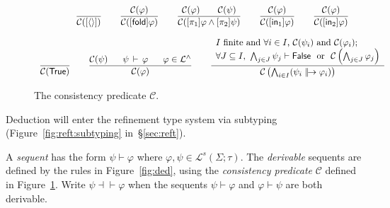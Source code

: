 \documentclass[%
  a4paper,
  UKenglish,
  cleveref,
  autoref,
  thm-restate,
  numberwithinsect,
]{lipics-v2021}
\newcommand\sle\subseteq
\newcommand\thesis{\vdash}
\newcommand\defthesisiff{\dashv\vdash}
\newcommand\thesisiff{\mathrel{\defthesisiff}}
\newcommand\pair[1]{{\langle #1\rangle}}
\newcommand\C{\mathcal{C}}		%
\newcommand\temp[1]{\mathsf{#1}}
\newcommand\True{\temp{True}}
\newcommand\False{\temp{False}}
\newcommand\term[1]{\mathsf{#1}}
\newcommand\inj{\mathop{\term{in}}}
\newcommand\fold{\mathop{\term{fold}}}
\newcommand\defrealto{\mathrel\parallel\joinrel\to}
\newcommand\realto{\mathrel{\defrealto}}
\newcommand\PT{\tau}		%
\newcommand\FPEnv{\Sigma}
\newcommand\Lang{\mathcal{L}}
\newcommand\form[1]{\lbrack #1 \rbrack}
\newcommand\sign{s}
\begin{document}
\begin{figure}[t!]
\centering
\(
\begin{array}{c}
%
\dfrac
  {}
  {\C(\form{\pair{}})}
%
\qquad
%
\dfrac{\C(\varphi)}
  {\C(\form\fold \varphi)}
%
\qquad
%
\dfrac{\C(\varphi) 
  \qquad
  \C(\psi)}
  {\C(\form{\pi_1}\varphi \land \form{\pi_2}\psi)}
%
\qquad
%
\dfrac{\C(\varphi)}
  {\C(\form{\inj_1}\varphi)}
%
\qquad
%
\dfrac{\C(\varphi)}
  {\C(\form{\inj_2}\varphi)}
%
\\\\
%
\dfrac{}{\C(\True)}
%
\qquad
%
\dfrac{\C(\psi)
  \quad~~
  \psi \,\thesis\, \varphi
  \quad~~
  \varphi \in \Lang^\land}
  {\C(\varphi)}
%
\qquad
%
\dfrac{\begin{array}{l}
  \text{$I$ finite and $\forall i \in I$,}~
  \C(\psi_i) 
  ~\text{and}~
  \C(\varphi_i) ;
  \\
  \text{$\forall J \sle I$,}~
  \bigwedge_{j \in J} \psi_j \thesis \False
  ~~\text{or}~~
  \C\left( \bigwedge_{j \in J} \varphi_j \right)
  \end{array}}
  {\C\left( \bigwedge_{i \in I}(\psi_i \realto \varphi_i) \right)}
%
\end{array}
\)
\caption{The consistency predicate $\C$.%
\label{fig:consist}}
\end{figure}

Deduction
will enter the refinement type system via subtyping
(Figure~\ref{fig:reft:subtyping} in~\S\ref{sec:reft}).

\begin{definition}[Deduction]
\label{def:ded}
A \emph{sequent} has the form $\psi \thesis \varphi$
where $\varphi,\psi \in \Lang^\sign(\FPEnv; \PT)$.
%
The \emph{derivable} sequents are defined by 
the rules in Figure~\ref{fig:ded},
using the \emph{consistency predicate} $\C$
defined in Figure~\ref{fig:consist}.
%
Write $\psi \thesisiff \varphi$ when the sequents
$\psi \thesis \varphi$ and $\varphi \thesis \psi$
are both derivable.
\end{definition}
\end{document}
